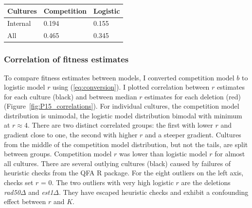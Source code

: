 \begin{multicols}{2}

\begin{center}
  \begin{tabular}{l l l}
    \hline
    Cultures     & Competition & Logistic \\
    \hline
    Internal     & 0.194    & 0.155\\
    All          & 0.465    & 0.345\\
    \hline
  \end{tabular}
  \label{tab:P15_obj_fun}
\end{center}

\subsubsection{Correlation of fitness estimates}
\label{sec:correlation}

To compare fitness estimates between models, I converted competition
model \(b\) to logistic model \(r\) using (\ref{eq:conversion}).
I plotted correlation between \(r\) estimates for each culture (black)
and between median \(r\) estimates for each deletion (red)
(Figure~\ref{fig:P15_correlations}).
For individual cultures, the competition model distribution is
unimodal, the logistic model distribution bimodal with minimum at
\(r \approx 4\). There are two distinct correlated groups: the first
with lower \(r\) and gradient close to one, the second with higher
\(r\) and a steeper gradient. Cultures from the middle of the
competition model distribution, but not the tails, are split between
groups. Competition model \(r\) was lower than logistic model \(r\)
for almost all cultures. There are several outlying cultures (black)
caused by failures of heuristic checks from the QFA R package. For the
eight outliers on the left axis, checks set \(r\) = 0. The two
outliers with very high logistic \(r\) are the deletions
\textit{rad50\(\Delta\)} and \textit{est1\(\Delta\)}. They have
escaped heuristic checks and exhibit a confounding effect between
\(r\) and \(K\).


\end{multicols}

